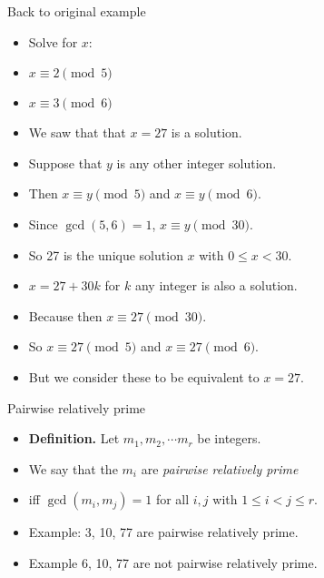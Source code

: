\documentclass{beamer}
\begin{document}
\begin{frame}{Back to original example}

\begin{itemize}
  \item Solve for $x$:
  \item $x \equiv 2 \pmod 5$
  \item $x \equiv 3 \pmod 6$
  \item We saw that that $x=27$ is a solution.
  \item Suppose that $y$ is any other integer solution.
  \item Then $x\equiv y \pmod 5$ and $x\equiv y \pmod 6$.
  \item Since $\gcd(5,6)=1$, $x\equiv y \pmod {30}$.
  \item So 27 is the unique solution $x$ with $0\leq x < 30$.
  \item $x = 27 + 30k$ for $k$ any integer is also a solution.
  \item Because then $x\equiv 27 \pmod {30}$.
  \item So $x\equiv 27 \pmod 5$ and $x\equiv 27 \pmod 6$.
  \item But we consider these to be equivalent to $x=27$.
\end{itemize}

\end{frame}

\begin{frame}{Pairwise relatively prime}

\begin{itemize}
  \item \textbf{Definition.} Let $m_1, m_2, \cdots m_r$  be integers.
  \item We say that the $m_i$ are \emph{pairwise relatively prime}
  \item iff $\gcd(m_i,m_j)=1$ for all $i,j$ with $1\leq i < j \leq r$.
  \item Example: 3, 10, 77 are pairwise relatively prime.
  \item Example 6, 10, 77 are not pairwise relatively prime.
\end{itemize}

\end{frame}
\end{document}
